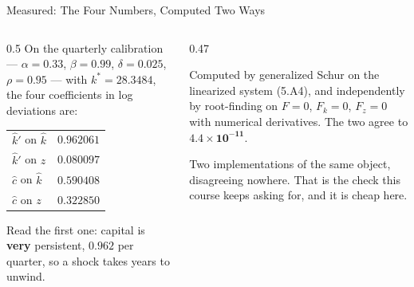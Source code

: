\begin{frame}{Measured: The Four Numbers, Computed Two Ways}
\begin{columns}[T]
\begin{column}{0.5\textwidth}
\small
On the quarterly calibration --- $\alpha=0.33$, $\beta=0.99$, $\delta=0.025$, $\rho=0.95$ --- with $k^{*}=28.3484$, the four coefficients in log deviations are:
\medskip
\begin{center}\footnotesize
\begin{tabularx}{\linewidth}{@{}>{\raggedright\arraybackslash}X r@{}}
\toprule
$\hat{k}'$ on $\hat{k}$ & $0.962061$ \\
$\hat{k}'$ on $z$ & $0.080097$ \\
$\hat{c}$ on $\hat{k}$ & $0.590408$ \\
$\hat{c}$ on $z$ & $0.322850$ \\
\bottomrule
\end{tabularx}
\end{center}
\medskip
Read the first one: capital is \textbf{very} persistent, $0.962$ per quarter, so a shock takes years to unwind.
\end{column}
\begin{column}{0.47\textwidth}
\begin{takeawaybox}[title=\textbf{Two routes, one answer}]\small
Computed by generalized Schur on the linearized system (5.A4), and independently by root-finding on $F=0$, $F_k=0$, $F_z=0$ with numerical derivatives. The two agree to $\mathbf{4.4\times10^{-11}}$.
\end{takeawaybox}
\medskip
\begin{examplebox}\footnotesize
Two implementations of the same object, disagreeing nowhere. That is the check this course keeps asking for, and it is cheap here.
\end{examplebox}
\end{column}
\end{columns}
\vspace{1mm}
\end{frame}

